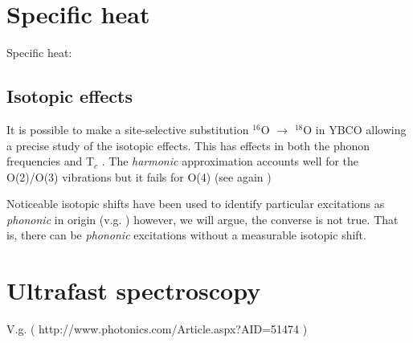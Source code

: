 \section{Specific heat}
Specific heat: \cite{Loram1993}


\subsection{Isotopic effects}

It is possible to make a site-selective substitution $^{16}$O $\rightarrow$ $^{18}$O in YBCO \cite{Conder1993} allowing a precise study of the isotopic effects. 
This has effects in both the phonon frequencies \cite{Ruani1994} and T$_{c}$ \cite{Zech1994,Cardona1988}. 
The \textit{harmonic} approximation accounts well for the O(2)/O(3) vibrations but it fails for O(4) (see again \cite{Ruani1994})

Noticeable isotopic shifts have been used to identify particular excitations as \textit{phononic} in origin (v.g. \cite{Thomsen1990}) however, we will argue, the converse is not true. 
That is, there can be \textit{phononic} excitations without a measurable isotopic shift.

\section{Ultrafast spectroscopy}

V.g. \cite{Basov2005} \cite{Smallwood2012} ( http://www.photonics.com/Article.aspx?AID=51474 )
